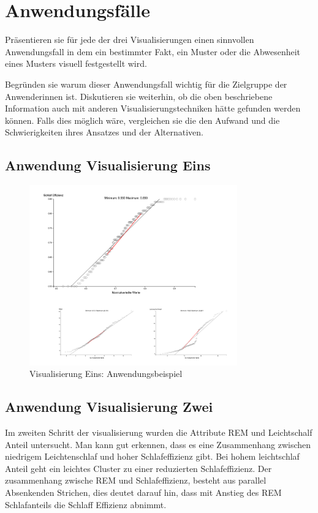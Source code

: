 \documentclass[usegeometry=true]{scrartcl}
\begin{document}
\section{Anwendungsfälle}
Präsentieren sie für jede der drei Visualisierungen einen sinnvollen Anwendungsfall 
in dem ein bestimmter Fakt, ein Muster oder die Abwesenheit eines Musters visuell festgestellt wird.


Begründen sie warum dieser Anwendungsfall wichtig für die Zielgruppe der Anwenderinnen ist.
Diskutieren sie weiterhin, ob die oben beschriebene Information auch mit anderen 
Visualisierungstechniken hätte gefunden werden können.
Falls dies möglich wäre, vergleichen sie die den Aufwand und die Schwierigkeiten ihres Ansatzes und der Alternativen. 
\subsection{Anwendung Visualisierung Eins}

\begin{figure}[h]
  \centering
  \includegraphics [width = 0.8\textwidth]{Bsp_QQ-Plot.JPG}
  \caption{Visualisierung Eins: Anwendungsbeispiel}
\end{figure}

\subsection{Anwendung Visualisierung Zwei}

Im zweiten Schritt der visualisierung wurden die Attribute REM und Leichtschalf Anteil untersucht. Man kann gut erkennen, dass es eine Zusammenhang zwischen niedrigem Leichtenschlaf und hoher Schlafeffizienz gibt. Bei hohem leichtschlaf Anteil geht ein leichtes Cluster zu einer reduzierten Schlafeffizienz. 
Der zusammenhang zwische REM und Schlafeffizienz, besteht aus parallel Absenkenden Strichen, dies deutet darauf hin, dass mit Anstieg des REM Schlafanteils die Schlaff Effizienz abnimmt.
\end{document}

